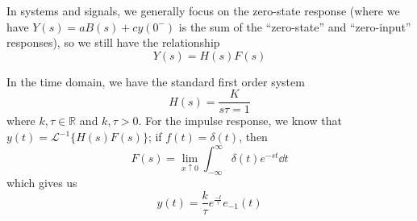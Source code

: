 \documentclass[12pt]{article}
\begin{document}
In systems and signals, we generally focus on the zero-state response (where we have $Y(s) = aB(s) + cy(0^-)$ is the sum of the ``zero-state'' and ``zero-input'' responses), so we still have the relationship \[ Y(s) = H(s)F(s) \]

In the time domain, we have the standard first order system \[ H(s) = \frac{K}{s\tau = 1} \] where $k, \tau \in \mathbb{R}$ and $k, \tau > 0$. For the impulse response, we know that $y(t) = \mathcal{L}^{-1} \{ H(s)F(s) \}$; if $f(t) = \delta(t)$, then \[ F(s) = \lim_{x\uparrow 0} \int_{-\infty}^\infty \delta(t) e^{-st} \dd t \] which gives us \[ y(t) = \frac{k}{\tau} e^{\frac{-t}{\tau}} e_{-1}(t) \]
\end{document}
